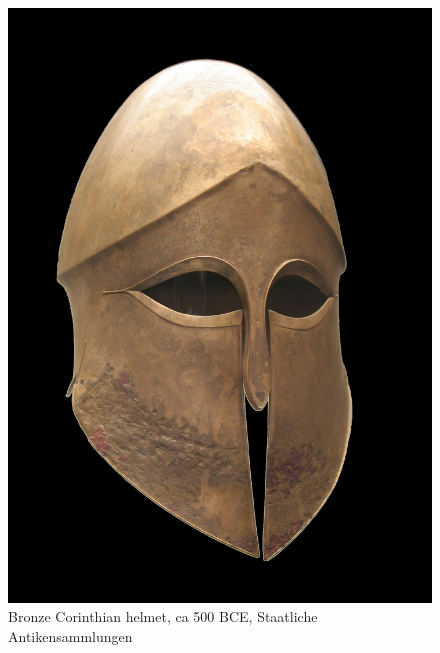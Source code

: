 \begin{figure}[htbp]
	\centering
		\includegraphics[scale=0.1]{graphics/helmet.jpg}
	\caption{Bronze Corinthian helmet, ca 500 BCE, Staatliche Antikensammlungen}
	\label{fig:helmet}
\end{figure}

